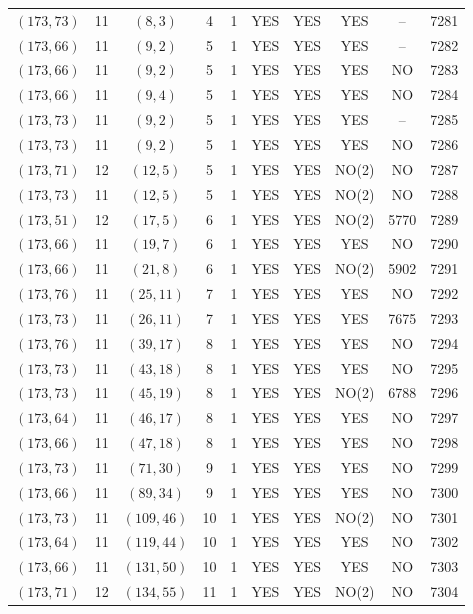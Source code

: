 \begin{longtable}{|c|c|c|c|c|c|c|c|c|c|}
$(173, 73)$ & 11 & $(8, 3)$ & 4 & 1 & YES & YES & YES & -- & 7281\\
$(173, 66)$ & 11 & $(9, 2)$ & 5 & 1 & YES & YES & YES & -- & 7282\\
$(173, 66)$ & 11 & $(9, 2)$ & 5 & 1 & YES & YES & YES & NO & 7283\\
$(173, 66)$ & 11 & $(9, 4)$ & 5 & 1 & YES & YES & YES & NO & 7284\\
$(173, 73)$ & 11 & $(9, 2)$ & 5 & 1 & YES & YES & YES & -- & 7285\\
$(173, 73)$ & 11 & $(9, 2)$ & 5 & 1 & YES & YES & YES & NO & 7286\\
$(173, 71)$ & 12 & $(12, 5)$ & 5 & 1 & YES & YES & NO(2) & NO & 7287\\
$(173, 73)$ & 11 & $(12, 5)$ & 5 & 1 & YES & YES & NO(2) & NO & 7288\\
$(173, 51)$ & 12 & $(17, 5)$ & 6 & 1 & YES & YES & NO(2) & 5770 & 7289\\
$(173, 66)$ & 11 & $(19, 7)$ & 6 & 1 & YES & YES & YES & NO & 7290\\
$(173, 66)$ & 11 & $(21, 8)$ & 6 & 1 & YES & YES & NO(2) & 5902 & 7291\\
$(173, 76)$ & 11 & $(25, 11)$ & 7 & 1 & YES & YES & YES & NO & 7292\\
$(173, 73)$ & 11 & $(26, 11)$ & 7 & 1 & YES & YES & YES & 7675 & 7293\\
$(173, 76)$ & 11 & $(39, 17)$ & 8 & 1 & YES & YES & YES & NO & 7294\\
$(173, 73)$ & 11 & $(43, 18)$ & 8 & 1 & YES & YES & YES & NO & 7295\\
$(173, 73)$ & 11 & $(45, 19)$ & 8 & 1 & YES & YES & NO(2) & 6788 & 7296\\
$(173, 64)$ & 11 & $(46, 17)$ & 8 & 1 & YES & YES & YES & NO & 7297\\
$(173, 66)$ & 11 & $(47, 18)$ & 8 & 1 & YES & YES & YES & NO & 7298\\
$(173, 73)$ & 11 & $(71, 30)$ & 9 & 1 & YES & YES & YES & NO & 7299\\
$(173, 66)$ & 11 & $(89, 34)$ & 9 & 1 & YES & YES & YES & NO & 7300\\
$(173, 73)$ & 11 & $(109, 46)$ & 10 & 1 & YES & YES & NO(2) & NO & 7301\\
$(173, 64)$ & 11 & $(119, 44)$ & 10 & 1 & YES & YES & YES & NO & 7302\\
$(173, 66)$ & 11 & $(131, 50)$ & 10 & 1 & YES & YES & YES & NO & 7303\\
$(173, 71)$ & 12 & $(134, 55)$ & 11 & 1 & YES & YES & NO(2) & NO & 7304\\

\end{longtable}
